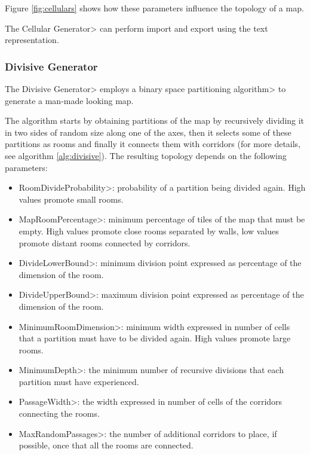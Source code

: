 Figure \ref{fig:cellulars} shows how these parameters influence the topology of a map.

\par

The \<Cellular Generator> can perform import and export using the text representation.


\subsubsection{Divisive Generator}\label{sssec:digger}

The \<Divisive Generator> employs a \<binary space partitioning algorithm> to generate a man-made looking map.

\par

The algorithm starts by obtaining partitions of the map by recursively dividing it in two sides of random size along one of the axes, then it selects some of these partitions as rooms and finally it connects them with corridors (for more details, see algorithm \ref{alg:divisive}). The resulting topology depends on the following parameters:

\begin{itemize}
\item \<RoomDivideProbability>: probability of a partition being divided again. High values promote small rooms.
\item \<MapRoomPercentage>: minimum percentage of tiles of the map that must be empty. High values promote close rooms separated by walls, low values promote distant rooms connected by corridors.
\item \<DivideLowerBound>: minimum division point expressed as percentage of the dimension of the room.
\item \<DivideUpperBound>: maximum division point expressed as percentage of the dimension of the room.
\item \<MinimumRoomDimension>: minimum width expressed in number of cells that a partition must have to be divided again. High values promote large rooms.
\item \<MinimumDepth>: the minimum number of recursive divisions that each partition must have experienced.
\item \<PassageWidth>: the width expressed in number of cells of the corridors connecting the rooms.
\item \<MaxRandomPassages>: the number of additional corridors to place, if possible, once that all the rooms are connected.
\end{itemize}

